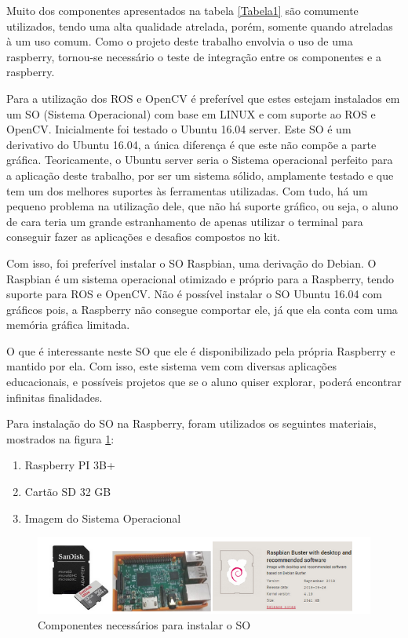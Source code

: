 Muito dos componentes apresentados na tabela \ref{Tabela1} são comumente utilizados, tendo uma alta qualidade atrelada, porém, somente quando atreladas à um uso comum. Como o projeto deste trabalho envolvia o uso de uma raspberry, tornou-se necessário o teste de integração entre os componentes e a raspberry.

Para a utilização dos ROS e OpenCV é preferível que estes estejam instalados em um SO (Sistema Operacional) com base em LINUX e com suporte ao ROS e OpenCV. Inicialmente foi testado o Ubuntu 16.04 server. Este SO é um derivativo do Ubuntu 16.04, a única diferença é que este não compõe a parte gráfica. Teoricamente, o Ubuntu server seria o Sistema operacional perfeito para a aplicação deste trabalho, por ser um sistema sólido, amplamente testado e que tem um dos melhores suportes às ferramentas utilizadas. Com tudo, há um pequeno problema na utilização dele, que não há suporte gráfico, ou seja, o aluno de cara teria um grande estranhamento de apenas utilizar o terminal para conseguir fazer as aplicações e desafios compostos no kit.

Com isso, foi preferível instalar o SO Raspbian, uma derivação do Debian. O Raspbian é um sistema operacional otimizado e próprio para a Raspberry, tendo suporte para ROS e OpenCV. Não é possível instalar o SO Ubuntu 16.04 com gráficos pois, a Raspberry não consegue comportar ele, já que ela conta com uma memória gráfica limitada.

O que é interessante neste SO que ele é disponibilizado pela própria Raspberry e mantido por ela. Com isso, este sistema vem com diversas aplicações educacionais, e possíveis projetos que se o aluno quiser explorar, poderá encontrar infinitas finalidades.

Para instalação do SO na Raspberry, foram utilizados os seguintes materiais, mostrados na figura \ref{fig:SO}:

\begin{enumerate}
	\item Raspberry PI 3B+
	\item Cartão SD 32 GB
	\item Imagem do Sistema Operacional
	
\end{enumerate}

\begin{figure}[H]
	\centering
	\includegraphics[scale=0.8, angle=0]{Figures/so.png}
	\caption{Componentes necessários para instalar o SO}
	\label{fig:SO}
\end{figure}

